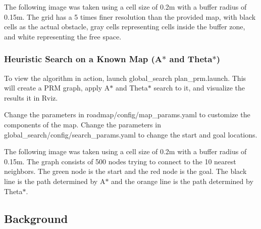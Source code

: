 The following image was taken using a cell size of 0.\+2m with a buffer radius of 0.\+15m. The grid has a 5 times finer resolution than the provided map, with black cells as the actual obstacle, gray cells representing cells inside the buffer zone, and white representing the free space.

 \subsubsection*{Heuristic Search on a Known Map (A$\ast$ and Theta$\ast$)}

To view the algorithm in action, launch {\ttfamily global\+\_\+search plan\+\_\+prm.\+launch}. This will create a P\+RM graph, apply A$\ast$ and Theta$\ast$ search to it, and visualize the results it in Rviz.

Change the parameters in {\ttfamily roadmap/config/map\+\_\+params.\+yaml} to customize the components of the map. Change the parameters in {\ttfamily global\+\_\+search/config/search\+\_\+params.\+yaml} to change the start and goal locations.

The following image was taken using a cell size of 0.\+2m with a buffer radius of 0.\+15m. The graph consists of 500 nodes trying to connect to the 10 nearest neighbors. The green node is the start and the red node is the goal. The black line is the path determined by A$\ast$ and the orange line is the path determined by Theta$\ast$.

 \subsection*{Background}
